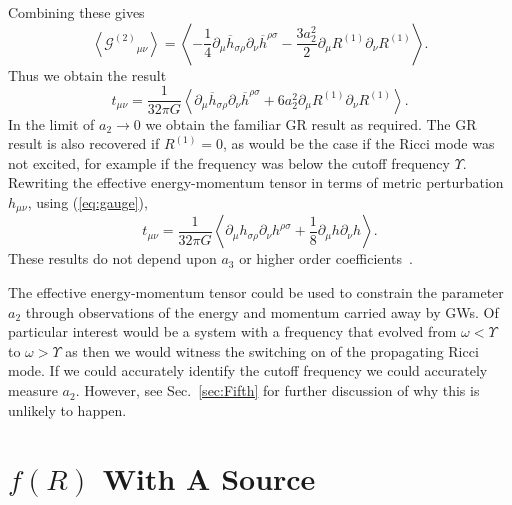 \documentclass[aps,prd,amsfonts,amssymb,amsmath,nofootinbib,reprint,showpacs]{revtex4-1}
\newcommand{\eqnref}[1]{(\ref{eq:#1})}
\newcommand{\secref}[1]{Sec.\ \ref{sec:#1}}
\newcommand{\recip}[1]{\ensuremath{\frac{1}{#1}}}
\begin{document}
Combining these gives
\begin{equation}
\left\langle {\mathcal{G}^{(2)}}_{\mu\nu}\right\rangle = \left\langle -\recip{4} \partial_\mu\overline{h}_{\sigma\rho}\partial_\nu\overline{h}^{\rho\sigma} - \frac{3a_2^2}{2}\partial_\mu R^{(1)}\partial_\nu R^{(1)} \right\rangle.
\end{equation}
Thus we obtain the result
\begin{equation}
t_{\mu\nu} = \recip{32\pi G}\left\langle \partial_\mu\overline{h}_{\sigma\rho}\partial_\nu\overline{h}^{\rho\sigma} + 6a_2^2\partial_\mu R^{(1)}\partial_\nu R^{(1)} \right\rangle.
\label{eq:Pseudotensor}
\end{equation}
In the limit of $a_2 \rightarrow 0$ we obtain the familiar GR result as required. The GR result is also recovered if $R^{(1)} = 0$, as would be the case if the Ricci mode was not excited, for example if the frequency was below the cutoff frequency $\Upsilon$. Rewriting the effective energy-momentum tensor in terms of metric perturbation $h_{\mu\nu}$, using \eqnref{gauge},
\begin{equation}
t_{\mu\nu} = \recip{32\pi G}\left\langle \partial_\mu h_{\sigma\rho}\partial_\nu h^{\rho\sigma} + \recip{8}\partial_\mu h \partial_\nu h \right\rangle.
\end{equation}
These results do not depend upon $a_3$ or higher order coefficients~\cite{Stein2011}.

The effective energy-momentum tensor could be used to constrain the parameter $a_2$ through observations of the energy and momentum carried away by GWs. Of particular interest would be a system with a frequency that evolved from $\omega < \Upsilon$ to $\omega > \Upsilon$ as then we would witness the switching on of the propagating Ricci mode. If we could accurately identify the cutoff frequency we could accurately measure $a_2$. However, see \secref{Fifth} for further discussion of why this is unlikely to happen.

\section{$f(R)$ With A Source\label{sec:Source}}
\end{document}
